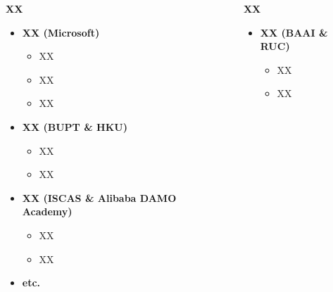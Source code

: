 \begin{frame}
    \vspace{-1.2em}
    \begin{columns}[T]
        \centering
        \begin{block}{\textbf{XX}}
            \begin{itemize}
                \item \textbf{XX (Microsoft)}
                    \begin{itemize}
                            \footnotesize
                        \item XX
                        \item XX
                        \item XX
                    \end{itemize}

                \item \textbf{XX (BUPT \& HKU)}
                    \begin{itemize}
                            \footnotesize
                        \item XX
                        \item XX
                    \end{itemize}

                \item \textbf{XX (ISCAS \& Alibaba DAMO Academy)}
                    \begin{itemize}
                            \footnotesize
                        \item XX
                        \item XX
                    \end{itemize}
                \item \textbf{etc.}
            \end{itemize}
        \end{block}

        \centering
        \begin{block}{\textbf{XX}}
            \begin{itemize}
                \item \textbf{XX (BAAI \& RUC)}
                    \begin{itemize}
                            \footnotesize
                        \item XX
                        \item XX
                    \end{itemize}


\end{itemize}
\end{block}
\end{columns}
\end{frame}
